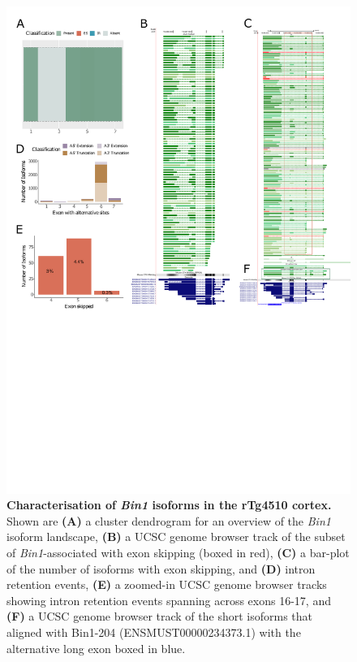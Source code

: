 \begin{figure}[htp]
	\centering
	\includegraphics[page=3,trim={0 1cm 0 0},scale = 0.85]{Figures/TargetGenes_Annotation_Portrait.pdf}
	\captionsetup{width=0.95\textwidth}
	\caption[Characterisation of the \textit{Bin1} isoform landscape]%
	{\textbf{Characterisation of \textit{Bin1} isoforms in the rTg4510 cortex.} Shown are \textbf{(A)} a cluster dendrogram for an overview of the \textit{Bin1} isoform landscape, \textbf{(B)} a UCSC genome browser track of the subset of \textit{Bin1}-associated with exon skipping (boxed in red), \textbf{(C)} a bar-plot of the number of isoforms with exon skipping, and \textbf{(D)} intron retention events, \textbf{(E)} a zoomed-in UCSC genome browser tracks showing intron retention events spanning across exons 16-17, and \textbf{(F)} a UCSC genome browser track of the short isoforms that aligned with Bin1-204 (ENSMUST00000234373.1) with the alternative long exon boxed in blue.}    
	\label{fig:bin1}
\end{figure}
\restoregeometry

